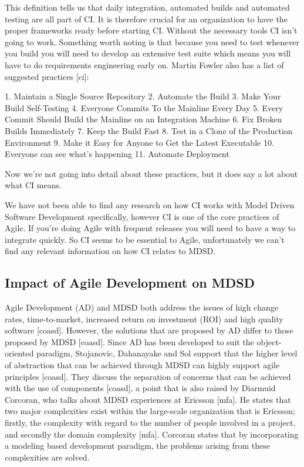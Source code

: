 \documentclass[fina_report_innit.tex]{subfiles}
\begin{document}
This definition tells us that daily integration, automated builds and automated testing are all part of CI. It is therefore crucial for an organization to have the proper frameworks ready before starting CI. Without the necessary tools CI isn’t going to work. Something worth noting is that because you need to test whenever you build you will need to develop an extensive test suite which means you will have to do requirements engineering early on. Martin Fowler also has a list of suggested practices [ci]: 

1.	Maintain a Single Source Repository
2.	Automate the Build
3.	Make Your Build Self-Testing
4.	Everyone Commits To the Mainline Every Day
5.	Every Commit Should Build the Mainline on an Integration Machine
6.	Fix Broken Builds Immediately
7.	Keep the Build Fast
8.	Test in a Clone of the Production Environment
9.	Make it Easy for Anyone to Get the Latest Executable
10.	Everyone can see what's happening
11.	Automate Deployment

Now we’re not going into detail about these practices, but it does say a lot about what CI means. 

We have not been able to find any research on how CI works with Model Driven Software Development specifically, however CI is one of the core practices of Agile. If you’re doing Agile with frequent releases you will need to have a way to integrate quickly. So CI seems to be essential to Agile, unfortunately we can’t find any relevant information on how CI relates to MDSD.

\subsection{Impact of Agile Development on MDSD}

Agile Development (AD) and MDSD both address the issues of high change rates, time-to-market, increased return on investment (ROI) and high quality software [coasd]. However, the solutions that are proposed by AD differ to those proposed by MDSD [coasd]. Since AD has been developed to suit the object-oriented paradigm, Stojanovic, Dahanayake and Sol support that the higher level of abstraction that can be achieved through MDSD can highly support agile principles [coasd]. They discuss the separation of concerns that can be achieved with the use of components [coasd], a point that is also raised by Diarmuid Corcoran, who talks about MDSD experiences at Ericsson [mfa]. He states that two major complexities exist within the large-scale organization that is Ericsson; firstly, the complexity with regard to the number of people involved in a project, and secondly the domain complexity [mfa]. Corcoran states that by incorporating a modeling based development paradigm, the problems arising from these complexities are solved. 
\end{document}
